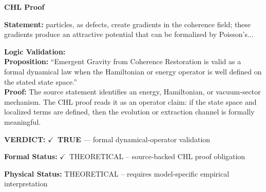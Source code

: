 \vspace{0.45em}
\noindent\textbf{CHL Proof}\par
\textbf{Statement:} particles, as defects, create gradients in the coherence field; these gradients produce
an attractive potential that can be formalized by Poisson's...

\textbf{Logic Validation:}\\
\textbf{Proposition:} ``Emergent Gravity from Coherence Restoration is valid as a formal dynamical law when the
Hamiltonian or energy operator is well defined on the stated state space.''\\
\textbf{Proof:} The source statement identifies an energy, Hamiltonian, or vacuum-sector mechanism. The
CHL proof reads it as an operator claim: if the state space and localized terms are
defined, then the evolution or extraction channel is formally meaningful.

\textbf{VERDICT:} \ensuremath{\checkmark}\ \textbf{TRUE} --- formal dynamical-operator validation

\textbf{Formal Status:} \ensuremath{\checkmark}\ THEORETICAL -- source-backed CHL proof obligation

\textbf{Physical Status:} THEORETICAL -- requires model-specific empirical interpretation
\par\vspace{0.45em}
\par
\ifTZPDarkEdition
{}
\fi
\endgroup
\endgroup
